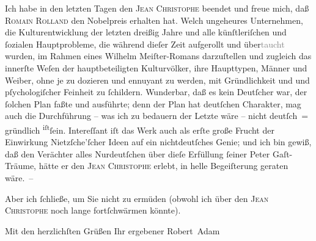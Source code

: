 \pstart
           Ich habe in den letzten Tagen den \textsc{Jean Christophe} beendet und freue mich, daß \textsc{Romain Rolland} den Nobelpreis erhalten hat. Welch
               ungeheures Unternehmen, die Kulturentwicklung der letzten dreißig Jahre und alle
               künſtleriſchen und ſozialen Hauptprobleme, die während dieſer Zeit aufgerollt und
                  über\textcolor{gray}{taucht} wurden, im Rahmen eines Wilhelm Meiſter-Romans darzuſtellen und zugleich das innerſte
               Weſen der hauptbeteiligten Kulturvölker, ihre Haupttypen, Männer und Weiber, ohne je
               zu dozieren und ennuyant zu werden, mit Gründlichkeit und und pſychologiſcher
               Feinheit  zu ſchildern. Wunderbar, daß es kein
               Deutſcher war, der ſolchen Plan faßte und ausführte; denn der Plan hat deutſchen
               Charakter, mag auch die Durchführung – was ich zu bedauern {\pb}der Letzte wäre – nicht deutſch = gründlich \substVorne{}\textsuperscript{iſt}\substDazwischen{}ſein\substHinten{}. Intereſſant iſt das Werk auch als erſte große Frucht der Einwirkung Nietzſche’ſcher Ideen auf ein nichtdeutſches
               Genie; und ich bin gewiß, daß den Verächter alles Nurdeutſchen über dieſe Erfüllung
               ſeiner Peter Gaſt-Träume, hätte er den \textsc{Jean Christophe} erlebt, in helle Begeiſterung geraten wäre. –\pend
           
\pstart
           Aber ich ſchließe, um Sie nicht zu ermüden (obwohl ich über den \textsc{Jean Christophe} noch lange fortſchwärmen könnte).\pend
           
\pstart
           Mit den herzlichſten Grüßen Ihr ergebener\pend
           \pstart \spacefill\mbox{Robert Adam}\pend{}\endnumbering{}  
      